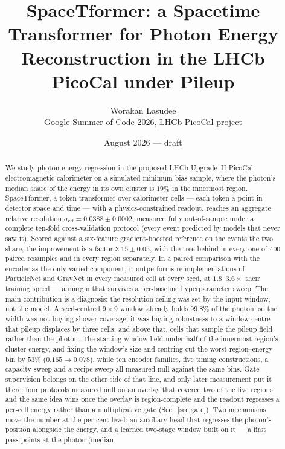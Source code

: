 \documentclass[11pt,a4paper]{article}
\title{SpaceTformer: a Spacetime Transformer for Photon Energy\\
Reconstruction in the LHCb PicoCal under Pileup}
\author{Worakan Lasudee\\
\small Google Summer of Code 2026, LHCb PicoCal project}
\date{August 2026 --- draft}
\newcommand{\seff}{\ensuremath{\sigma_{\mathrm{eff}}}}
\begin{document}
\maketitle

\begin{abstract}
We study photon energy regression in the proposed LHCb Upgrade~II PicoCal
electromagnetic calorimeter on a simulated minimum-bias sample, where the
photon's median share of the energy in its own cluster is $19\%$ in the
innermost region. SpaceTformer,
a token transformer over calorimeter cells --- each token a point in detector
space and time --- with a physics-constrained readout, reaches an aggregate
relative resolution $\seff = 0.0388 \pm 0.0002$, measured fully out-of-sample
under a complete ten-fold cross-validation protocol (every event predicted by
models that never saw it). Scored against a six-feature gradient-boosted
reference on the events the two share, the improvement is a factor
$3.15 \pm 0.05$, with the tree behind in every one of $400$ paired
resamples and in every region separately. In a paired comparison with
the encoder as the only varied component, it outperforms re-implementations
of ParticleNet and GravNet in every measured cell at every seed, at
$1.8$--$3.6\times$ their training speed --- a margin that survives a
per-baseline hyperparameter sweep. The main contribution is a
diagnosis: the resolution ceiling was set by the input window, not the
model. A seed-centred $9{\times}9$ window already holds $99.8\%$ of the
photon, so the width was not buying shower coverage: it was buying
robustness to a window centre that pileup displaces by three cells, and
above that, cells that sample the pileup field rather than the photon. The starting window held under half of the innermost region's cluster
energy, and fixing the window's size and centring cut the worst
region--energy bin by $53\%$ ($0.165 \to 0.078$), while ten encoder
families, five timing constructions, a capacity sweep and a recipe sweep
all measured null against the same bins. Gate supervision belongs on the
other side of that line, and only later measurement put it there: four
protocols measured null on an overlay that covered two of the five regions,
and the same idea wins once the overlay is region-complete and the readout
regresses a per-cell energy rather than a multiplicative gate
(Sec.~\ref{sec:gate}).
Two mechanisms move the number at the per-cent level: an auxiliary head
that regresses the photon's position alongside the energy, and a learned
two-stage window built on it --- a first pass points at the photon (median

\end{abstract}
\end{document}
